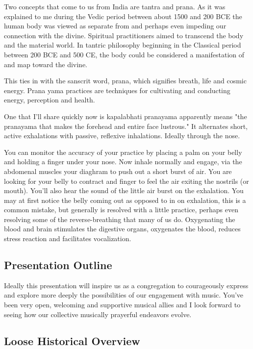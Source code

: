 \documentclass[12pt]{article}
\begin{document}
Two concepts that come to us from India are tantra and prana. As it was explained to me during the Vedic period between about 1500 and 200 BCE the human body was viewed as separate from and perhaps even impeding our connection with the divine. Spiritual practitioners aimed to transcend the body and the material world. In tantric philosophy beginning in the Classical period between 200 BCE and 500 CE, the body could be considered a manifestation of and map toward the divine.

This ties in with the sanscrit word, prana, which signifies breath, life and cosmic energy. Prana yama practices are techniques for cultivating and conducting energy, perception and health.

One that I'll share quickly now is kapalabhati pranayama apparently means "the pranayama that makes the forehead and entire face lustrous." It alternates short, active exhalations with passive, reflexive inhalations. Ideally through the nose.

You can monitor the accuracy of your practice by placing a palm on your belly and holding a finger under your nose. Now inhale normally and engage, via the abdomenal muscles your diaghram to push out a short burst of air. You are looking for your belly to contract and finger to feel the air exiting the nostrils (or mouth). You'll also hear the sound of the little air burst on the exhalation. You may at first notice the belly coming out as opposed to in on exhalation, this is a common mistake, but generally is resolved with a little practice, perhaps even resolving some of the reverse-breathing that many of us do. Oxygenating the blood and brain stimulates the digestive organs, oxygenates the blood, reduces stress reaction and facilitates vocalization.

\subsection*{Presentation Outline}

Ideally this presentation will inspire us as a congregation to courageously express and explore more deeply the possibilities of our engagement with music. You've been very open, welcoming and supportive musical allies and I look forward to seeing how our collective musically prayerful endeavors evolve.

\subsection*{Loose Historical Overview}
\end{document}
